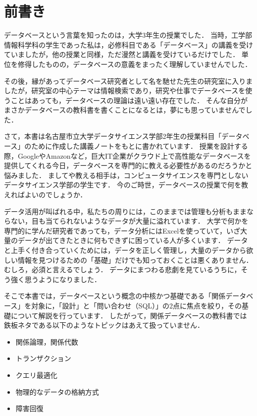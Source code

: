 \section*{前書き}
データベースという言葉を知ったのは，大学3年生の授業でした．
当時，工学部情報科学科の学生であった私は，必修科目である「データベース」の講義を受けていましたが，他の授業と同様，ただ漫然と講義を受けているだけでした．
単位を修得したものの，データベースの意義をまったく理解していませんでした．

その後，縁があってデータベース研究者として名を馳せた先生の研究室に入りましたが，研究室の中心テーマは情報検索であり，研究や仕事でデータベースを使うことはあっても，データベースの理論は遠い遠い存在でした．
そんな自分がまさかデータベースの教科書を書くことになるとは，夢にも思っていませんでした．

さて，本書は名古屋市立大学データサイエンス学部2年生の授業科目「データベース」のために作成した講義ノートをもとに書かれています．
授業を設計する際，GoogleやAmazonなど，巨大IT企業がクラウド上で高性能なデータベースを提供してくれる今日，データベースを専門的に教える必要性があるのだろうかと悩みました．
ましてや教える相手は，コンピュータサイエンスを専門としないデータサイエンス学部の学生です．
今のご時世，データベースの授業で何を教えればよいのでしょうか．

データ活用が叫ばれる中，私たちの周りには，このままでは管理も分析もままならない，目も当てられないようなデータが大量に溢れています．
大学で何かを専門的に学んだ研究者であっても，データ分析にはExcelを使っていて，いざ大量のデータが出てきたときに何もできずに困っている人が多くいます．
データと上手く付き合っていくためには，データを正しく管理し，大量のデータから欲しい情報を見つけるための「基礎」だけでも知っておくことは悪くありません．
むしろ，必須と言えるでしょう．
データにまつわる悲劇を見ているうちに，そう強く思うようになりました．

そこで本書では，データベースという概念の中核かつ基礎である「関係データベース」を対象に，「設計」と「問い合わせ（SQL）」の2点に焦点を絞り，その基礎について解説を行っています．
したがって，関係データベースの教科書では鉄板ネタである以下のようなトピックはあえて扱っていません．
\begin{itemize}
    \item 関係論理，関係代数
    \item トランザクション
    \item クエリ最適化
    \item 物理的なデータの格納方式
    \item 障害回復
\end{itemize}

